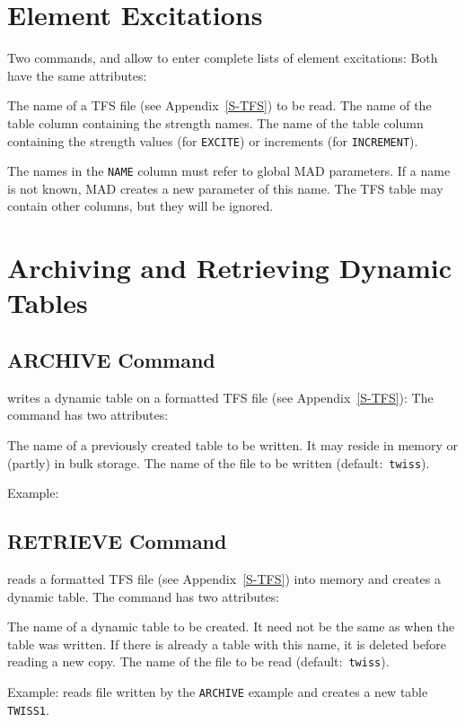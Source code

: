 \section{Element Excitations}
\label{S-EXCITE}
Two commands,  and   allow to enter
complete lists of element excitations:
Both have the same attributes:
\begin{mylist}
The name of a TFS file (see Appendix~\ref{S-TFS}) to be read.
The name of the table column containing the strength names.
The name of the table column containing the strength values
(for {\tt EXCITE}) or increments (for {\tt INCREMENT}).
\end{mylist}
The names in the {\tt NAME} column must refer to global MAD parameters.
If a name is not known, MAD creates a new parameter of this name.
The TFS table may contain other columns, but they will be ignored.
 
\section{Archiving and Retrieving Dynamic Tables}
\label{S-ARCHRET}
\subsection{ARCHIVE Command}
 writes a dynamic table on a formatted TFS file
(see Appendix~\ref{S-TFS}):
The command has two attributes:
\begin{mylist}
The name of a previously created table to be written.
It may reside in memory or (partly) in bulk storage.
The name of the file to be written (default:~{\tt twiss}).
\end{mylist}
Example:
\subsection{RETRIEVE Command}
 reads a formatted TFS file
(see Appendix~\ref{S-TFS}) into memory
and creates a dynamic table.
The command has two attributes:
\begin{mylist}
The name of a dynamic table to be created.
It need not be the same as when the table was written.
If there is already a table with this name,
it is deleted before reading a new copy.
The name of the file to be read (default:~{\tt twiss}).
\end{mylist}
Example:
reads file written by the {\tt ARCHIVE} example and creates a new
table {\tt TWISS1}.
 
